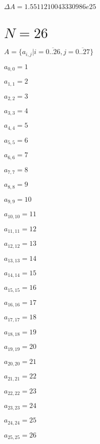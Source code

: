 \documentclass[a4paper,12pt]{article}
\begin{document}
$\Delta A = 1.5511210043330986e25$



\section{ $N = 26$ }
$A = \{ a _{ i, j } | i = \overline { 0..26 }, j = \overline { 0..27 } \}$

$a _{ 0, 0 } = 1$

$a _{ 1, 1 } = 2$

$a _{ 2, 2 } = 3$

$a _{ 3, 3 } = 4$

$a _{ 4, 4 } = 5$

$a _{ 5, 5 } = 6$

$a _{ 6, 6 } = 7$

$a _{ 7, 7 } = 8$

$a _{ 8, 8 } = 9$

$a _{ 9, 9 } = 10$

$a _{ 10, 10 } = 11$

$a _{ 11, 11 } = 12$

$a _{ 12, 12 } = 13$

$a _{ 13, 13 } = 14$

$a _{ 14, 14 } = 15$

$a _{ 15, 15 } = 16$

$a _{ 16, 16 } = 17$

$a _{ 17, 17 } = 18$

$a _{ 18, 18 } = 19$

$a _{ 19, 19 } = 20$

$a _{ 20, 20 } = 21$

$a _{ 21, 21 } = 22$

$a _{ 22, 22 } = 23$

$a _{ 23, 23 } = 24$

$a _{ 24, 24 } = 25$

$a _{ 25, 25 } = 26$
\end{document}

